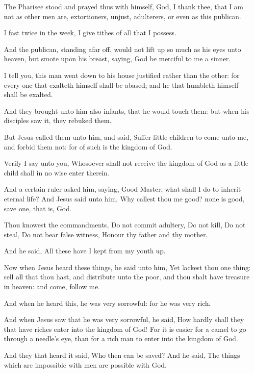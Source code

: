 \Verse The Pharisee stood and prayed thus with himself, God, I thank thee, that I am not as other men are, extortioners, unjust, adulterers, or even as this publican.

\Verse I fast twice in the week, I give tithes of all that I possess.

\Verse And the publican, standing afar off, would not lift up so much as his eyes unto heaven, but smote upon his breast, saying, God be merciful to me a sinner.

\Verse I tell you, this man went down to his house justified rather than the other: for every one that exalteth himself shall be abased; and he that humbleth himself shall be exalted.

\Verse And they brought unto him also infants, that he would touch them: but when his disciples saw it, they rebuked them.

\Verse But Jesus called them unto him, and said, Suffer little children to come unto me, and forbid them not: for of such is the kingdom of God.

\Verse Verily I say unto you, Whosoever shall not receive the kingdom of God as a little child shall in no wise enter therein.

\Verse And a certain ruler asked him, saying, Good Master, what shall I do to inherit eternal life?  \Verse And Jesus said unto him, Why callest thou me good? none is good, save one, that is, God.

\Verse Thou knowest the commandments, Do not commit adultery, Do not kill, Do not steal, Do not bear false witness, Honour thy father and thy mother.

\Verse And he said, All these have I kept from my youth up.

\Verse Now when Jesus heard these things, he said unto him, Yet lackest thou one thing: sell all that thou hast, and distribute unto the poor, and thou shalt have treasure in heaven: and come, follow me.

\Verse And when he heard this, he was very sorrowful: for he was very rich.

\Verse And when Jesus saw that he was very sorrowful, he said, How hardly shall they that have riches enter into the kingdom of God!  \Verse For it is easier for a camel to go through a needle's eye, than for a rich man to enter into the kingdom of God.

\Verse And they that heard it said, Who then can be saved?  \Verse And he said, The things which are impossible with men are possible with God.

